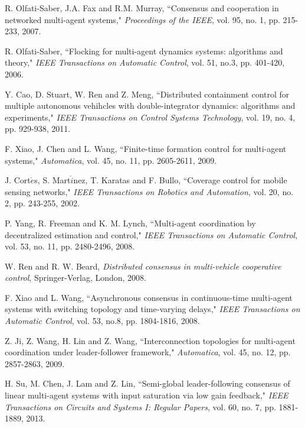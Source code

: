 \documentclass[12pt,draftcls,onecolumn]{IEEEtran}
\begin{document}
\begin{thebibliography}{1}

R. Olfati-Saber,  J.A. Fax and R.M. Murray,
``Consensus and cooperation in networked multi-agent systems,"
{\it Proceedings of the IEEE}, vol. 95, no. 1, pp. 215-233, 2007.

R. Olfati-Saber,
``Flocking for multi-agent dynamics systems: algorithms and theory,"
\emph{IEEE Transactions on Automatic Control}, vol. 51, no.3, pp. 401-420, 2006.

Y. Cao, D. Stuart, W. Ren and Z. Meng,
``Distributed containment control for multiple autonomous vehihcles with
double-integrator dynamics: algorithms and experiments,"
\emph{IEEE Transactions on Control Systems Technology}, vol. 19, no. 4, pp. 929-938, 2011.

F. Xiao, J. Chen and L. Wang,
``Finite-time formation control for multi-agent systems,"
\emph{Automatica}, vol. 45, no. 11, pp. 2605-2611, 2009.

J. Cort$\acute{e}$s, S. Mart$\acute{i}$nez, T. Karatas and F. Bullo,
``Coverage control for mobile sensing networks,"
\emph{IEEE Transactions on Robotics and Automation}, vol. 20, no. 2, pp. 243-255, 2002.

P. Yang, R. Freeman and  K. M. Lynch,
``Multi-agent coordination by decentralized estimation and control,"
\emph{IEEE Transactions on Automatic Control}, vol. 53, no. 11, pp. 2480-2496, 2008.

W. Ren and R. W. Beard,
\emph{Distributed consensus in multi-vehicle cooperative control},
Springer-Verlag, London, 2008.

F. Xiao and L. Wang,
``Asynchronous consensus in continuous-time multi-agent systems with switching topology and time-varying delays," \emph{IEEE Transactions on Automatic Control}, vol. 53, no.8, pp. 1804-1816, 2008.


Z. Ji, Z. Wang, H. Lin and Z. Wang,
``Interconnection topologies for multi-agent coordination under leader-follower framework,"
\emph{Automatica}, vol. 45, no. 12, pp. 2857-2863, 2009.

H. Su, M. Chen, J. Lam and Z. Lin,
``Semi-global leader-following consensus of linear multi-agent systems with input saturation via low gain feedback," \emph{IEEE Transactions on  Circuits and Systems I: Regular Papers}, vol. 60, no. 7, pp. 1881-1889, 2013.


\end{thebibliography}
\end{document}
